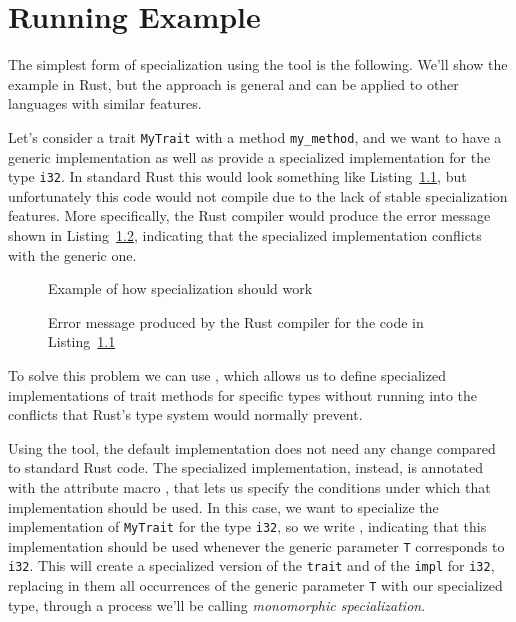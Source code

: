 \chapter{Running Example}\label{chap:running_example}

The simplest form of specialization using the tool is the following.
We'll show the example in Rust, but the approach is general and can be applied to other languages with similar features.

Let's consider a trait \texttt{MyTrait} with a method \texttt{my\_method}, and we want to have a generic implementation as well as provide a specialized implementation for the type \texttt{i32}.
In standard Rust this would look something like Listing~\ref{fig:monomorphic_specialization_problem}, but unfortunately this code would not compile due to the lack of stable specialization features.
More specifically, the Rust compiler would produce the error message shown in Listing~\ref{fig:monomorphic_specialization_error}, indicating that the specialized implementation conflicts with the generic one.

\begin{figure}[htbp!]
	\centering
	\captionsetup{type=listing,skip=2pt}
	\caption{Example of how specialization should work}
	\label{fig:monomorphic_specialization_problem}
\end{figure}

\begin{figure}[htbp!]
	\centering
	\captionsetup{type=listing,skip=2pt}
	\caption{Error message produced by the Rust compiler for the code in Listing~\ref{fig:monomorphic_specialization_problem}}
	\label{fig:monomorphic_specialization_error}
\end{figure}

To solve this problem we can use \mytool{}, which allows us to define specialized implementations of trait methods for specific types without running into the conflicts that Rust's type system would normally prevent.

Using the tool, the default implementation does not need any change compared to standard Rust code.
The specialized implementation, instead, is annotated with the attribute macro \inlinerust{#[when(...)]}, that lets us specify the conditions under which that implementation should be used.
In this case, we want to specialize the implementation of \texttt{MyTrait} for the type \texttt{i32}, so we write \inlinerust{#[when(T = i32)]}, indicating that this implementation should be used whenever the generic parameter \texttt{T} corresponds to \texttt{i32}.
This will create a specialized version of the \texttt{trait} and of the \texttt{impl} for \texttt{i32}, replacing in them all occurrences of the generic parameter \texttt{T} with our specialized type, through a process we'll be calling \textit{monomorphic specialization}.

